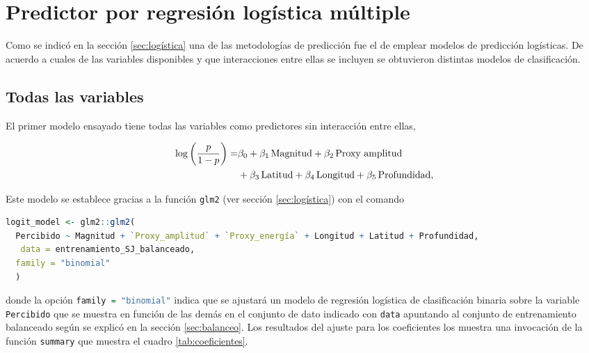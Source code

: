 \documentclass[a4paper]{report}
\begin{document}


\section{Predictor por regresión logística múltiple}

Como se indicó en la sección \ref{sec:logística} una de las metodologías de predicción fue el de emplear modelos de predicción logísticas.
De acuerdo a cuales de las variables disponibles y que interacciones entre ellas  se incluyen se obtuvieron distintas modelos de clasificación.


\subsection{Todas las variables}\label{sec:logística_sin_interacción}

El primer modelo ensayado tiene todas las variables como predictores sin interacción entre ellas,

\begin{align}
	\log \left( \frac{p}{1-p} \right) = & \beta_0 
	+ \beta_1\, \text{Magnitud} 
	+ \beta_2 \, \text{Proxy amplitud}\notag\\
	& + \beta_3 \, \text{Latitud} 
	+ \beta_4 \, \text{Longitud} 
	+ \beta_5 \, \text{Profundidad} 
	,
	\label{eq:regresion_logistica}
\end{align}

Este modelo se establece gracias a la función \lstinline[language = R]'glm2' (ver sección \ref{sec:logística}) con el comando
\begin{lstlisting}[language=R, breaklines=true]
logit_model <- glm2::glm2(
  Percibido ~ Magnitud + `Proxy_amplitud` + `Proxy_energía` + Longitud + Latitud + Profundidad,
   data = entrenamiento_SJ_balanceado,
  family = "binomial"
  )
\end{lstlisting}
donde la opción \lstinline[language = R]'family = "binomial"' indica que se ajustará un modelo de regresión logística de clasificación binaria sobre la variable \lstinline[language=R]|Percibido| que se muestra en función de las demás en el conjunto de dato indicado con \lstinline[language=R]|data| apuntando al conjunto de entrenamiento balanceado según se explicó en la sección \ref{sec:balanceo}.
Los resultados del ajuste para los coeficientes los muestra una invocación de la función \lstinline[language = R]'summary' que muestra el cuadro \ref{tab:coeficientes}. 
\end{document}
